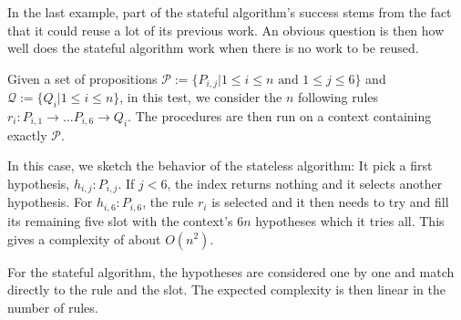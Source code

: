 \documentclass[runningheads]{llncs}
\begin{document}
\begin{figure}
        \end{figure}

In the last example, part of the stateful algorithm's success stems from the fact that it could reuse a lot of its previous work.
An obvious question is then how well does the stateful algorithm work when there is no work to be reused.

Given a set of propositions $\mathcal{P} := \{P_{i,j} | 1 \leq i \leq n \text{ and } 1 \leq j \leq 6\}$ and $\mathcal{Q} :=\{Q_{i} | 1 \leq i \leq n \}$, in this test, we consider the $n$ following rules $r_i : P_{i,1}\to \dots P_{i,6} \to Q_i$.
The procedures are then run on a context containing exactly $\mathcal{P}$.

In this case, we sketch the behavior of the stateless algorithm:
It pick a first hypothesis, $h_{i,j} : P_{i,j}$.
If $j < 6$, the index returns nothing and it selects another hypothesis.
For $h_{i,6} : P_{i,6}$, the rule $r_i$ is selected and it then needs to try and fill its remaining five slot with the context's $6n$ hypotheses which it tries all.
This gives a complexity of about $O(n^2)$.

For the stateful algorithm, the hypotheses are considered one by one and match directly to the rule and the slot.
The expected complexity is then linear in the number of rules.
\end{document}

